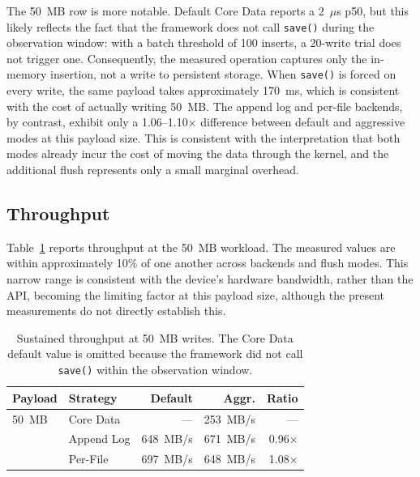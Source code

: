 The 50~MB row is more notable. Default Core Data reports a 2~$\mu$s
p50, but this likely reflects the fact that the framework does not
call \texttt{save()} during the observation window: with a batch
threshold of 100 inserts, a 20-write trial does not trigger one.
Consequently, the measured operation captures only the in-memory
insertion, not a write to persistent storage. When \texttt{save()} is
forced on every write, the same payload takes approximately 170~ms,
which is consistent with the cost of actually writing 50~MB. The
append log and per-file backends, by contrast, exhibit only a
1.06--1.10$\times$ difference between default and aggressive modes at
this payload size. This is consistent with the interpretation that
both modes already incur the cost of moving the data through the
kernel, and the additional flush represents only a small marginal
overhead.

\subsection{Throughput}
Table~\ref{tab:throughput} reports throughput at the 50~MB workload.
The measured values are within approximately 10\% of one another
across backends and flush modes. This narrow range is consistent with
the device's hardware bandwidth, rather than the API, becoming the
limiting factor at this payload size, although the present
measurements do not directly establish this.

\begin{table}[t]
\centering
\footnotesize
\setlength{\tabcolsep}{4pt}
\begin{tabular}{@{}llrrr@{}}
\hline
\textbf{Payload} & \textbf{Strategy} & \textbf{Default} & \textbf{Aggr.} & \textbf{Ratio} \\
\hline
50~MB & Core Data  & ---       & 253~MB/s & --- \\
      & Append Log & 648~MB/s  & 671~MB/s & 0.96$\times$ \\
      & Per-File   & 697~MB/s  & 648~MB/s & 1.08$\times$ \\
\hline
\end{tabular}
\caption{Sustained throughput at 50~MB writes. The Core Data default
  value is omitted because the framework did not call \texttt{save()}
  within the observation window.}
\label{tab:throughput}
\end{table}

